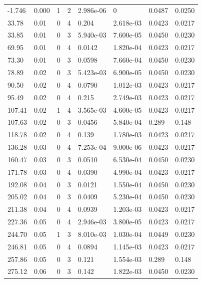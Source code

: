 \documentclass[preview]{standalone}
\begin{document}
{{\begin{tabular}{L{1.2cm}C{1.2cm} C{0.3cm}C{0.5cm} C{1.4cm}C{1.4cm} C{1.4cm}C{1.4cm}}
  -1.746  &  0.000  & 1     &  2 &  2.986e-06  & 0  & 0.0487 &  0.0250   \\ 
  33.78  &  0.01  & 0     &  4 &  0.204  & 2.618e-03  & 0.0423 &  0.0217   \\ 
  33.85  &  0.01  & 0     &  3 &  5.940e-03  & 7.600e-05  & 0.0450 &  0.0230   \\ 
  69.95  &  0.01  & 0     &  4 &  0.0142  & 1.820e-04  & 0.0423 &  0.0217   \\ 
  73.30  &  0.01  & 0     &  3 &  0.0598  & 7.660e-04  & 0.0450 &  0.0230   \\ 
  78.89  &  0.02  & 0     &  3 &  5.423e-03  & 6.900e-05  & 0.0450 &  0.0230   \\ 
  90.50  &  0.02  & 0     &  4 &  0.0790  & 1.012e-03  & 0.0423 &  0.0217   \\ 
  95.49  &  0.02  & 0     &  4 &  0.215  & 2.749e-03  & 0.0423 &  0.0217   \\ 
  107.41  &  0.02  & 1     &  4 &  3.565e-03  & 4.600e-05  & 0.0423 &  0.0217   \\ 
  107.63  &  0.02  & 0     &  3 &  0.0456  & 5.840e-04  & 0.289 &  0.148   \\ 
  118.78  &  0.02  & 0     &  4 &  0.139  & 1.780e-03  & 0.0423 &  0.0217   \\ 
  136.28  &  0.03  & 0     &  4 &  7.253e-04  & 9.000e-06  & 0.0423 &  0.0217   \\ 
  160.47  &  0.03  & 0     &  3 &  0.0510  & 6.530e-04  & 0.0450 &  0.0230   \\ 
  171.78  &  0.03  & 0     &  4 &  0.0390  & 4.990e-04  & 0.0423 &  0.0217   \\ 
  192.08  &  0.04  & 0     &  3 &  0.0121  & 1.550e-04  & 0.0450 &  0.0230   \\ 
  205.02  &  0.04  & 0     &  3 &  0.0409  & 5.230e-04  & 0.0450 &  0.0230   \\ 
  211.38  &  0.04  & 0     &  4 &  0.0939  & 1.203e-03  & 0.0423 &  0.0217   \\ 
  227.36  &  0.05  & 0     &  4 &  2.946e-03  & 3.800e-05  & 0.0423 &  0.0217   \\ 
  244.70  &  0.05  & 1     &  3 &  8.010e-03  & 1.030e-04  & 0.0449 &  0.0230   \\ 
  246.81  &  0.05  & 0     &  4 &  0.0894  & 1.145e-03  & 0.0423 &  0.0217   \\ 
  257.86  &  0.05  & 0     &  3 &  0.121  & 1.554e-03  & 0.289 &  0.148   \\ 
  275.12  &  0.06  & 0     &  3 &  0.142  & 1.822e-03  & 0.0450 &  0.0230   \\ 

\end{tabular}}}
\end{document}

